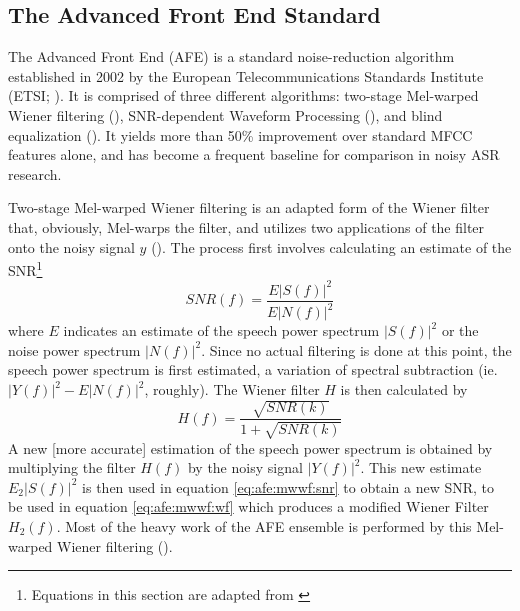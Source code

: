\DIFdelbegin \subsubsection{}%
\addtocounter{subsubsection}{-1}%
\DIFdelend \DIFaddbegin \subsection{The Advanced Front End Standard}\DIFaddend \label{sec:background-afe}

The Advanced Front End (AFE) is a standard noise-reduction algorithm established in 2002 by the European Telecommunications Standards Institute (ETSI; \cite{etsi:02}).  It is comprised of three different algorithms: two-stage Mel-warped Wiener filtering (\cite{agarwal:99}), SNR-dependent Waveform Processing (\cite{macho:01}), and blind equalization (\cite{mauuary:98}).  It yields more than 50\% improvement over standard MFCC features alone, and has become a frequent baseline for comparison in noisy ASR research.

Two-stage Mel-warped Wiener filtering is an adapted form of the Wiener filter that, obviously, Mel-warps the filter, and utilizes two applications of the filter onto the noisy signal $y$ (\cite{etsi:02}).  The process first involves calculating an estimate of the SNR\footnote{Equations in this section are adapted from \cite{etsi:02}} \begin{equation}\label{eq:afe:mwwf:snr} SNR(f) = \dfrac{E|S(f)|^2}{E|N(f)|^2} \end{equation} where $E$ indicates an estimate of the speech power spectrum $|S(f)|^2$ or the noise power spectrum $|N(f)|^2$.  Since no actual filtering is done at this point, the speech power spectrum is first estimated, a variation of spectral subtraction (ie. $|Y(f)|^2 - E|N(f)|^2$, roughly).  The Wiener filter $H$ is then calculated by \begin{equation}\label{eq:afe:mwwf:wf} H(f) = \dfrac{\sqrt{SNR(k)}}{1+\sqrt{SNR(k)}} \end{equation}  A new [more accurate] estimation of the speech power spectrum is obtained by multiplying the filter $H(f)$ by the noisy signal $|Y(f)|^2$.  This new estimate $E_2|S(f)|^2$ is then used in equation \ref{eq:afe:mwwf:snr} to obtain a new SNR, to be used in equation \ref{eq:afe:mwwf:wf} which produces a modified Wiener Filter $H_2(f)$.  Most of the heavy work of the AFE ensemble is performed by this Mel-warped Wiener filtering (\cite{li:14}).

